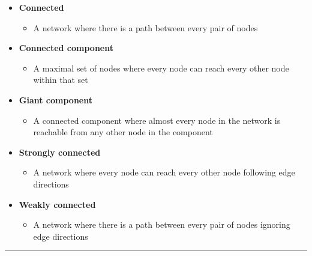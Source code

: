 \documentclass[
  letterpaper,
  DIV=11,
  numbers=noendperiod,
  oneside]{scrartcl}
\providecommand{\tightlist}{%
  \setlength{\itemsep}{0pt}\setlength{\parskip}{0pt}}
\begin{document}
\begin{itemize}
\tightlist
\item
  \textbf{Connected}

  \begin{itemize}
  \tightlist
  \item
    A network where there is a path between every pair of nodes
  \end{itemize}
\item
  \textbf{Connected component}

  \begin{itemize}
  \tightlist
  \item
    A maximal set of nodes where every node can reach every other node
    within that set
  \end{itemize}
\item
  \textbf{Giant component}

  \begin{itemize}
  \tightlist
  \item
    A connected component where almost every node in the network is
    reachable from any other node in the component
  \end{itemize}
\item
  \textbf{Strongly connected}

  \begin{itemize}
  \tightlist
  \item
    A network where every node can reach every other node following edge
    directions
  \end{itemize}
\item
  \textbf{Weakly connected}

  \begin{itemize}
  \tightlist
  \item
    A network where there is a path between every pair of nodes ignoring
    edge directions
  \end{itemize}
\end{itemize}

\begin{center}\rule{0.5\linewidth}{0.5pt}\end{center}
\end{document}
